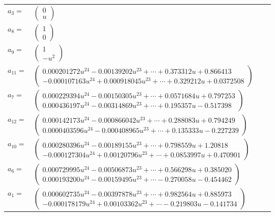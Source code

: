 \documentclass[1p]{elsarticle_modified}
\theoremstyle{definition}
\begin{document}
\begin{tabular}{m{7pt} m{180pt} m{7pt} m{180pt} }
\flushright $a_{3}=$&$\begin{pmatrix}0\\u\end{pmatrix}$ \\
\flushright $a_{8}=$&$\begin{pmatrix}1\\0\end{pmatrix}$ \\
\flushright $a_{9}=$&$\begin{pmatrix}1\\- u^2\end{pmatrix}$ \\
\flushright $a_{11}=$&$\begin{pmatrix}0.000201272 u^{24}-0.00139202 u^{23}+\cdots+0.373312 u+0.866413\\-0.000107163 u^{24}+0.000918045 u^{23}+\cdots+0.329212 u+0.0372508\end{pmatrix}$ \\
\flushright $a_{7}=$&$\begin{pmatrix}0.000229394 u^{24}-0.00150305 u^{23}+\cdots+0.0571684 u+0.797253\\0.000436197 u^{24}-0.00314869 u^{23}+\cdots+0.195357 u-0.517398\end{pmatrix}$ \\
\flushright $a_{12}=$&$\begin{pmatrix}0.000142173 u^{24}-0.000866042 u^{23}+\cdots+0.288083 u+0.794249\\0.0000403596 u^{24}-0.000408965 u^{23}+\cdots+0.135333 u-0.227239\end{pmatrix}$ \\
\flushright $a_{10}=$&$\begin{pmatrix}0.000280396 u^{24}-0.00189155 u^{23}+\cdots+0.798559 u+1.20818\\-0.000127304 u^{24}+0.00120796 u^{23}+\cdots+0.0853997 u+0.470901\end{pmatrix}$ \\
\flushright $a_{6}=$&$\begin{pmatrix}0.000729995 u^{24}-0.00506873 u^{23}+\cdots+0.566298 u+0.385020\\0.000193200 u^{24}-0.00159495 u^{23}+\cdots-0.270058 u-0.454462\end{pmatrix}$ \\
\flushright $a_{1}=$&$\begin{pmatrix}0.000602735 u^{24}-0.00397878 u^{23}+\cdots+0.982564 u+0.885973\\-0.000178179 u^{24}+0.00103362 u^{23}+\cdots-0.219803 u-0.141734\end{pmatrix}$ \\

\end{tabular}
\end{document}
